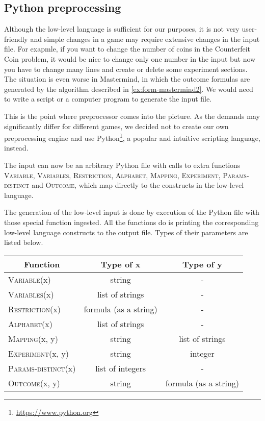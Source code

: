 \subsection{Python preprocessing}

Although the low-level language is sufficient for our purposes,
  it is not very user-friendly and
  simple changes in a game may require extensive changes in the input file.
For exapmle, if you want to change the number of coins in the Counterfeit Coin problem,
  it would be nice to change only one number in the input
  but now you have to change many lines and create or delete some experiment sections.
The situation is even worse in Mastermind, in which the outcome formulas are
  generated by the algorithm described in \ref{ex:form-mastermind2}.
We would need to write a script or a computer program to generate the input file.

This is the point where preprocessor comes into the picture.
As the demands may significantly differ for different games,
  we decided not to create our own preprocessing engine
  and use Python\footnote{\url{https://www.python.org}},
  a popular and intuitive scripting language, instead.

The input can now be an arbitrary Python file with calls to extra functions
\textsc{Variable}, \textsc{Variables}, \textsc{Restriction}, \textsc{Alphabet},
\textsc{Mapping}, \textsc{Experiment}, \textsc{Params-distinct} and \textsc{Outcome},
which map directly to the constructs in the low-level language.

The generation of the low-level input is done by execution of the Python file
  with those special function ingested.
All the functions do is printing the corresponding low-level language constructs
  to the output file.
Types of their parameters are listed below.

\begin{center}
\begin{tabular}{lcc}
 \multicolumn{1}{c}{\textbf{Function}} & \textbf{Type of x} & \textbf{Type of y} \\\hline
\textsc{Variable}(x) & string & - \\
\textsc{Variables}(x) & list of strings & -\\
\textsc{Restriction}(x) & formula (as a string)& -\\
\textsc{Alphabet}(x) & list of strings & -\\
\textsc{Mapping}(x, y) & string & list of strings\\
\textsc{Experiment}(x, y) & string & integer \\
\textsc{Params-distinct}(x) & list of integers & -\\
\textsc{Outcome}(x, y) & string & formula (as a string)
\end{tabular}
\end{center}

